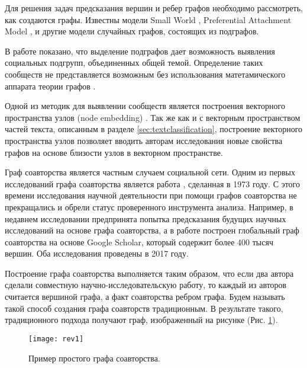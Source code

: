 Для решения задач предсказания вершин и ребер графов необходимо рассмотреть, как создаются графы.
Известны модели Small World \cite{watts1998collective}, Preferential Attachment Model \cite{barabasi1999emergence}, и другие модели случайных графов, состоящих из подграфов.

В работе \cite{fortunato2010community} показано, что выделение подграфов дает возможность выявления социальных подгрупп, объединенных общей темой. 
Определение таких сообществ не представляется возможным без использования матетамического аппарата теории графов \cite{lancichinetti2009community}. 

Одной из методик для выявлении сообществ является построения векторного пространства узлов (node embedding) \cite{zheng2016node}. Так же как и с векторным пространством частей текста, описанным в разделе \ref{sec:textclassification}, построение векторного пространства узлов позволяет вводить авторам исследования \cite{liu2017semantic} новые свойства графов на основе близости узлов в векторном пространстве.

Граф соавторства является частным случаем социальной сети. 
Одним из первых исследований графа соавторства является работа \cite{mullins1973development}, сделанная в 1973 году.
С этого времени исследования научной деятельности при помощи графов соавторства не прекращались и обрели статус проверенного инструмента анализа. 
Например, в недавнем исследовании \cite{chuan2018link} предпринята попытка предсказания будущих научных исследований на основе графа соавторства, а в работе \cite{chen2017building} построен глобальный граф соавторства на основе Google Scholar, который содержит более 400 тысяч вершин. Оба исследования проведены в 2017 году.

Построение графа соавторства выполняется таким образом, что если два автора сделали совместную научно-исследовательскую работу, то каждый из авторов считается вершиной графа, а факт соавторства ребром графа. 
Будем называть такой способ создания графа соавторств традиционным. 
В результате такого, традиционного подхода получают граф, изображенный на рисунке (Рис. \ref{fig:rev1}).

\begin{figure}[H]
  \centering
  \texttt{[image: rev1]}
  \label{fig:rev1}
  \caption{Пример простого графа соавторства.}
\end{figure}
